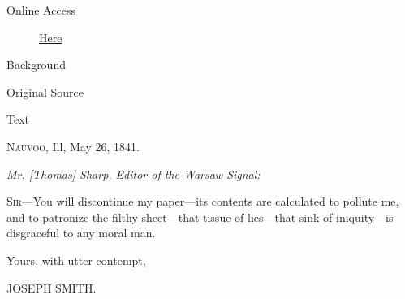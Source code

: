 			\begin{description}
				\item[Online Access] \href{https://www.josephsmithpapers.org/paper-summary/letter-to-thomas-sharp-26may-1841/1}{Here}
			\end{description}
			
			\begin{description}
				\item[Background]
			\end{description}
			
			
			\begin{description}
				\item[Original Source]
			\end{description}
			
			
			\begin{description}
				\item[Text]
			\end{description}
			
				\begin{tightright}
					\textsc{Nauvoo}, Ill, May 26, 1841.
				\end{tightright}
				
				\textit{Mr. [Thomas] Sharp, Editor of the Warsaw Signal:}
				
				\textsc{Sir}---You will discontinue my paper---its contents are calculated to pollute me, and to patronize the filthy sheet---that tissue of lies---that sink of iniquity---is disgraceful to any moral man.
				
				\begin{tightright}
					Yours, with utter contempt,
				
					JOSEPH SMITH.
				\end{tightright}
				
